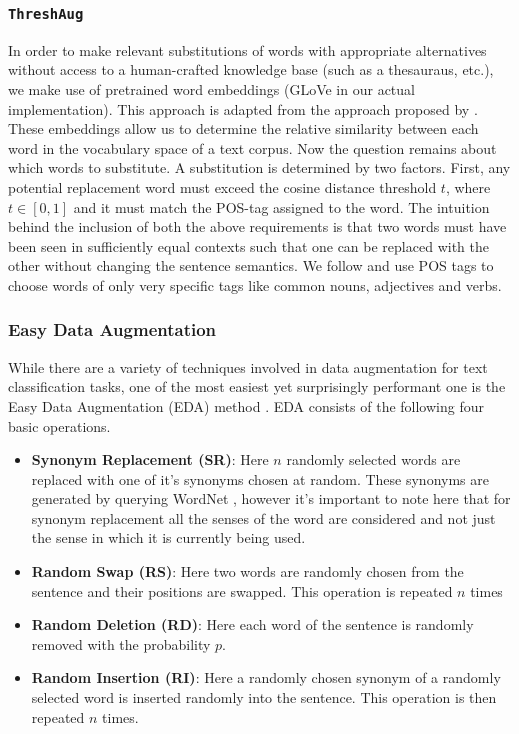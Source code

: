 \documentclass[11pt,a4paper]{article}
\begin{document}
\subsubsection{\texttt{ThreshAug}}
In order to make relevant substitutions of words with appropriate alternatives without access to a human-crafted knowledge base (such as a thesauraus, etc.), we make use of pretrained word embeddings (GLoVe in our actual implementation). This approach is adapted from the approach proposed by \citet{aug2prev}. These embeddings allow us to determine the relative similarity between each word in the vocabulary space of a text corpus. Now the question remains about which words to substitute. A substitution is determined by two factors. First, any potential replacement word must exceed the cosine distance threshold $t$, where $t \in  [0, 1]$ and it must match the POS-tag assigned to the word. The intuition behind the inclusion of both the above requirements is that two words must have been seen in sufficiently equal contexts such that one can be replaced with the other without changing the sentence semantics. We follow \citet{aug2prev} and use POS tags to choose words of only very specific tags like common nouns, adjectives and verbs. 


\subsubsection{Easy Data Augmentation}

While there are a variety of techniques involved in data augmentation for text classification tasks, one of the most easiest yet surprisingly performant one is the Easy Data Augmentation (EDA) method \cite{wei-zou-2019-eda}. EDA consists of the following four basic operations. 

\begin{itemize}
\item \textbf{Synonym Replacement (SR)}: Here $n$ randomly selected words are replaced with one of it's synonyms chosen at random. These synonyms are generated by querying WordNet \cite{WordNet}, however it's important to note here that for synonym replacement all the senses of the word are considered and not just the sense in which it is currently being used. 
\item \textbf{Random Swap (RS)}: Here two words are randomly chosen from the sentence and their positions are swapped. This operation is repeated $n$ times
\item \textbf{Random Deletion (RD)}: Here each word of the sentence is randomly removed with the probability $p$.
\item \textbf{Random Insertion (RI)}: Here a randomly chosen synonym of a randomly selected word is inserted randomly into the sentence. This operation is then repeated $n$ times.
\end{itemize}
\end{document}
